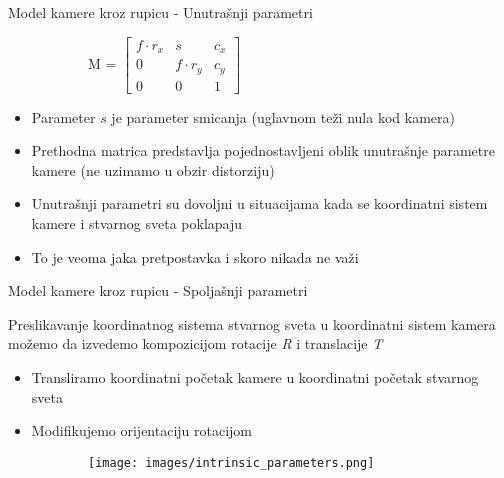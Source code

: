 \documentclass[bookmarks=true,bookmarksopen=true,pdfborder={0 0 0},pdfhighlight={/N},linkbordercolor={.5 .5 .5},implicit=false,unicode,xcolor={table}]{beamer}
\begin{document}
\begin{frame}{Model kamere kroz rupicu - Unutrašnji parametri}

  \begin{figure}
      \begin{subfigure}{4cm}
        M =
        $\begin{bmatrix}
          f\cdot r_{x} & s & c_{x}\\
          0 & f\cdot r_{y} & c_{y}\\
          0 & 0 & 1
        \end{bmatrix}$
      \end{subfigure}
    \end{figure}

  \begin{itemize}
    \item Parameter $s$ je parameter smicanja (uglavnom teži nula kod kamera)
    \item Prethodna matrica predstavlja pojednostavljeni oblik unutrašnje parametre kamere (ne uzimamo u obzir distorziju)
    \item Unutrašnji parametri su dovoljni u situacijama kada se koordinatni sistem kamere i stvarnog sveta poklapaju
    \item To je veoma jaka pretpostavka i skoro nikada ne važi
  \end{itemize}
\end{frame}

\begin{frame}{Model kamere kroz rupicu - Spoljašnji parametri}

  Preslikavanje koordinatnog sistema stvarnog sveta u koordinatni sistem kamera možemo da izvedemo kompozicijom rotacije 
  \textit{R} i translacije \textit{T}
  \begin{itemize}
    \item Transliramo koordinatni početak kamere u koordinatni početak stvarnog sveta
    \item Modifikujemo orijentaciju rotacijom
  \end{itemize}

  \begin{figure}
    \begin{subfigure}{7cm}
      \texttt{[image: images/intrinsic\_parameters.png]}
    \end{subfigure}
  \end{figure}

\end{frame}
\end{document}
